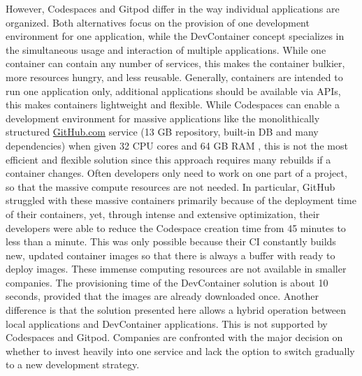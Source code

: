        However, Codespaces and Gitpod differ in the way individual applications are organized. Both alternatives focus on the provision of one development environment for one application, while the DevContainer concept specializes in the simultaneous usage and interaction of multiple applications. While one container can contain any number of services, this makes the container bulkier, more resources hungry, and less reusable. Generally, containers are intended to run one application only, additional applications should be available via \ac{API}s, this makes containers lightweight and flexible. While Codespaces can enable a development environment for massive applications like the monolithically structured \href{https://www.GitHub.com}{GitHub.com} service (13 GB repository, built-in \ac{DB} and many dependencies) when given 32 CPU cores and 64 GB RAM \cite{githubblogcodespace}, this is not the most efficient and flexible solution since this approach requires many rebuilds if a container changes. Often developers only need to work on one part of a project, so that the massive compute resources are not needed. In particular, GitHub struggled with these massive containers primarily because of the deployment time of their containers, yet, through intense and extensive optimization, their developers were able to reduce the Codespace creation time from 45 minutes to less than a minute. This was only possible because their \ac{CI} constantly builds new, updated container images so that there is always a buffer with ready to deploy images. These immense computing resources are not available in smaller companies. The provisioning time of the DevContainer solution is about 10 seconds, provided that the images are already downloaded once. Another difference is that the solution presented here allows a hybrid operation between local applications and DevContainer applications. This is not supported by Codespaces and Gitpod. Companies are confronted with the major decision on whether to invest heavily into one service and lack the option to switch gradually to a new development strategy.\newline
